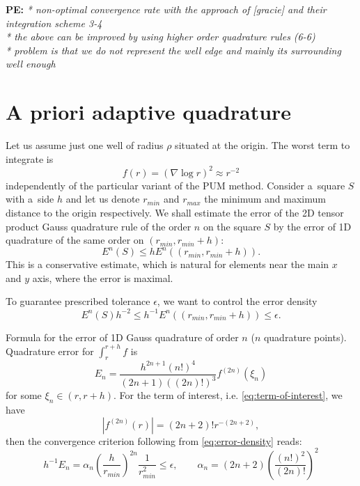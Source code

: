 \documentclass[preprint,12pt]{elsarticle}
\def\abs#1{\left|#1\right|}
\def\abs#1{| #1 |}
\newcommand{\notePE}[1]{{\color{Orange} \textbf{PE: } \textit{#1}}}
\begin{document}
\notePE{
* non-optimal convergence rate with the approach of [gracie] and their integration scheme 3-4\\
* the above can be improved by using higher order quadrature rules (6-6)\\
* problem is that we do not represent the well edge and mainly its surrounding well enough
}

\section{A priori adaptive quadrature}

Let us assume just one well of radius $\rho$ situated at the origin. The worst term to integrate is
\begin{equation}
    \label{eq:term-of-interest}
    f(r)=(\nabla \log r )^2 \approx r^{-2}
\end{equation}
%
independently of the particular variant of the PUM method. Consider a~square $S$ with a~side $h$ and 
let us denote $r_{min}$ and $r_{max}$ the minimum and maximum distance to the origin respectively.
We shall estimate the error of the 2D tensor product Gauss quadrature rule of the order $n$ on the square $S$  
by the error of 1D quadrature of the same order on $(r_{min}, r_{min}+h)$:
\[
  E^n(S) \le h E^n((r_{min}, r_{min}+h)).
\]
This is a conservative estimate, which is natural for elements near the main $x$ and $y$ axis, where the error is maximal.

To guarantee prescribed tolerance $\epsilon$, we want to control the error density
\begin{equation}
    \label{eq:error-density}
     E^n(S) h^{-2} \le h^{-1} E^n((r_{min}, r_{min}+h)) \le \epsilon. 
\end{equation}

Formula for the error of 1D Gauss quadrature of order $n$ ($n$ quadrature points). Quadrature error for $\int_r^{r+h} f$ is 
\[
  E_n = \frac{h^{2n+1} (n!)^4}{(2n+1)((2n)!)^3} f^{(2n)}(\xi_n) 
\]
for some $\xi_n \in (r, r+h)$. 
For the term of interest, i.e. \eqref{eq:term-of-interest}, we have 
\[
  \abs{f^{(2n)}(r)} = (2n+2)! r^{-(2n+2)},
\]
then the convergence criterion following from \eqref{eq:error-density} reads:
\[
  h^{-1}E_n = \alpha_n \left( \frac{h}{r_{min}} \right)^{2n} \frac{1}{r_{min}^2} \le \epsilon, 
  \qquad \alpha_n = (2n+2)\left( \frac{(n!)^2}{(2n)!} \right)^2
\]
\end{document}
